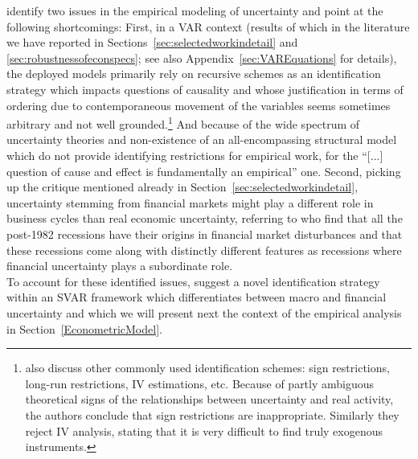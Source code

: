 \documentclass[a4paper,11pt,listof=nochaptergap,oneside,pointednumbers,bibtotoc,bigheadings,liststotoc,hidelinks]{scrbook}
\theoremstyle{mysatz}
\theoremstyle{mydefinition}
\theoremstyle{mytheorem}
\theoremstyle{mybemerkung}
\begin{document}
 \citet{ludvigsonetal:18} identify two issues in the empirical modeling of uncertainty and point at the following shortcomings: First, in a VAR context (results of which in the literature we have reported in Sections~\ref{sec:selectedworkindetail} and \ref{sec:robustnessofeconspecs}; see also Appendix~\ref{sec:VAREquations} for details), the deployed models primarily rely on recursive schemes as an identification strategy which impacts questions of causality and whose justification in terms of ordering due to contemporaneous movement of the variables seems sometimes arbitrary and not well grounded.\footnote{\citet{ludvigsonetal:18} also discuss other commonly used identification schemes: sign restrictions, long-run restrictions, IV estimations, etc. Because of partly ambiguous theoretical signs of the relationships between uncertainty and real activity, the authors conclude that sign restrictions are inappropriate. Similarly they reject IV analysis, stating that it is very difficult to find truly exogenous instruments.} And because of the wide spectrum of uncertainty theories and non-existence of an all-encompassing structural model which do not provide identifying restrictions for empirical work, for \citet[p. 5]{ludvigsonetal:18} the ``[...] question of cause and effect is fundamentally an empirical'' one. Second, picking up the critique mentioned already in Section~\ref{sec:selectedworkindetail}, uncertainty stemming from financial markets might play a different role in business cycles than real economic uncertainty, referring to \citet{ngandwright:13} who find that all the post-1982 recessions have their origins in financial market disturbances and that these recessions come along with distinctly different features as recessions where financial uncertainty plays a subordinate role.\\

To account for these identified issues, \citet{ludvigsonetal:18} suggest a novel identification strategy within an SVAR framework which differentiates between macro and financial uncertainty and which we will present next the context of the empirical analysis in Section~\ref{EconometricModel}.



\end{document}
